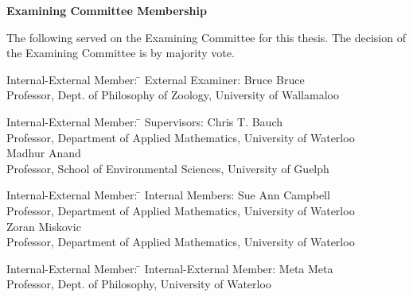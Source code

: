 \cleardoublepage %

 
\begin{center}\textbf{Examining Committee Membership}\end{center}
  \noindent
The following served on the Examining Committee for this thesis. The decision of the Examining Committee is by majority vote.
  \bigskip
  
  \noindent
\begin{tabbing}
Internal-External Member: \=  \kill %
External Examiner: \>  Bruce Bruce \\ 
\> Professor, Dept. of Philosophy of Zoology, University of Wallamaloo \\
\end{tabbing} 
  \bigskip
  
  \noindent
\begin{tabbing}
Internal-External Member: \=  \kill %
Supervisors: \> Chris T. Bauch \\
\> Professor, Department of Applied Mathematics, University of Waterloo \\
\> Madhur Anand \\
\> Professor, School of Environmental Sciences, University of Guelph \\
\end{tabbing}
  \bigskip
  
  \noindent
  \begin{tabbing}
Internal-External Member: \=  \kill %
Internal Members: \> Sue Ann Campbell \\
\> Professor, Department of Applied Mathematics, University of Waterloo \\ 
\> Zoran Miskovic  \\
\> Professor, Department of Applied Mathematics, University of Waterloo \\
\end{tabbing}
  \bigskip
  
  \noindent
\begin{tabbing}
Internal-External Member: \=  \kill %
Internal-External Member: \> Meta Meta \\
\> Professor, Dept. of Philosophy, University of Waterloo \\
\end{tabbing}
  \bigskip
  
